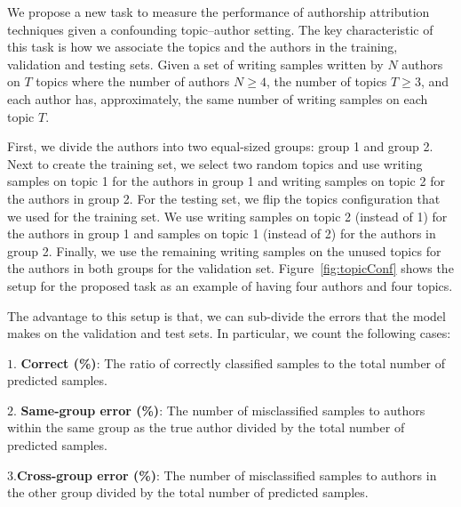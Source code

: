\documentclass[11pt]{article}
\begin{document}
We propose a new task to measure the performance of authorship attribution techniques given a confounding topic--author setting. The key characteristic of this task is how we associate the topics and the authors in the training, validation and testing sets. Given a set of writing samples written by $N$ authors on $T$ topics where the number of authors $N \geq 4$, the number of topics $T \geq 3$, and each author has, approximately, the same number of writing samples on each topic $T$. 

First, we divide the authors into two equal-sized groups: group 1 and group 2. Next to create the training set, we select two random topics and use writing samples on topic 1 for the authors in group 1 and writing samples on topic 2 for the authors in group 2. For the testing set, we flip the topics configuration that we used for the training set. We use writing samples on topic 2 (instead of 1) for the authors in group 1 and samples on topic 1 (instead of 2) for the authors in group 2. Finally, we use the remaining writing samples on the unused topics for the authors in both groups for the validation set. Figure~\ref{fig:topicConf} shows the setup for the proposed task as an example of having four authors and four topics.


The advantage to this setup is that, we can sub-divide the errors that the model makes on the validation and test sets. In particular, we count the following cases:

\noindent$1.$ \textbf{Correct (\%)}: The ratio of correctly classified samples to the total number of predicted samples.

\noindent$2.$ \textbf{Same-group error (\%)}: The number of misclassified samples to authors within the same group as the true author divided by the total number of predicted samples.

\noindent$3.$\textbf{Cross-group error (\%)}: The number of misclassified samples to authors in the other group divided by the total number of predicted samples.
\end{document}
